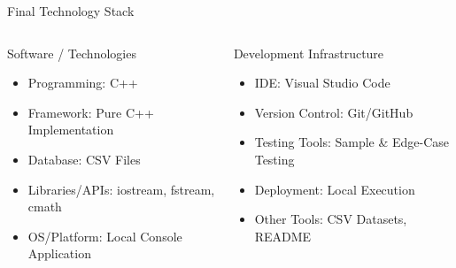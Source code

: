 \documentclass[aspectratio=169,11pt]{beamer}
\begin{document}
\begin{frame}{Final Technology Stack}

\begin{columns}[T,totalwidth=\textwidth]


\begin{block}{Software / Technologies}
\begin{itemize}\itemsep2pt
    \item Programming: {C++}
    \item Framework: {Pure C++ Implementation}
    \item Database: {CSV Files}
    \item Libraries/APIs: {iostream, fstream, cmath}
    \item OS/Platform: {Local Console Application}
\end{itemize}
\end{block}


\begin{block}{Development Infrastructure}
\begin{itemize}\itemsep2pt
    \item IDE: {Visual Studio Code}
    \item Version Control: Git/GitHub
    \item Testing Tools: {Sample \& Edge-Case Testing}
    \item Deployment: {Local Execution}
    \item Other Tools: {CSV Datasets, README}
\end{itemize}
\end{block}

\end{columns}

\vfill



\end{frame}
\end{document}
